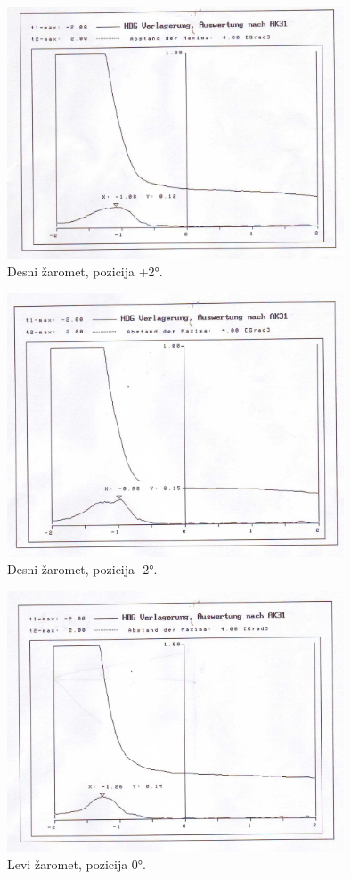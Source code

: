 \documentclass[oneside, a4paper, 12pt]{book}
\begin{document}
\begin{figure}
\begin{center}
\includegraphics[width=10cm]{slike/fotometer-desni-+2.jpg}
\end{center}
\caption{Desni žaromet, pozicija +2°.}
\label{pic:opt-g}
\end{figure}

\begin{figure}
\begin{center}
\includegraphics[width=10cm]{slike/fotometer-desni--2.jpg}
\end{center}
\caption{Desni žaromet, pozicija -2°.}
\label{pic:opt-g}
\end{figure}

\begin{figure}
\begin{center}
\includegraphics[width=10cm]{slike/fotometer-levi-0.jpg}
\end{center}
\caption{Levi žaromet, pozicija 0°.}
\label{pic:opt-g}
\end{figure}
\end{document}
